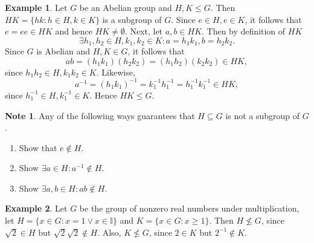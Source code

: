 \documentclass{article}
\newtheorem{theorem}{Theorem}[section]
\theoremstyle{definition}
\newtheorem{example}{Example}[section]
\newtheorem{note}{Note}[section]
\begin{document}
    \begin{example}
    Let $G$ be an Abelian group and $H,K \leq G$. Then $HK = \{hk: h \in H, k \in K\}$ is a subgroup of $G$. Since $e \in H, e \in K$, it follows that $e= ee \in HK$ and hence $HK \neq \emptyset$. Next, let $a,b \in HK$. Then by definition of $HK$
    \begin{equation*}
        \exists h_1,h_2 \in H, k_1,k_2 \in K: a=h_1k_1, b=h_2k_2.
    \end{equation*}
    Since $G$ is Abelian and $H,K \in G$, it follows that
    \begin{equation*}
        ab = (h_1k_1)(h_2k_2) = (h_1h_2)(k_2k_2) \in HK,
    \end{equation*}
    since $h_1h_2 \in H, k_1k_2 \in K$. Likewise,
    \begin{equation*}
        a^{-1} = (h_1k_1)^{-1} = k_1^{-1}h_1^{-1} = h_1^{-1}k_1^{-1} \in HK,
    \end{equation*}
    since $h_1^{-1} \in H, k_1^{-1} \in K$. Hence $HK \leq G$.
    \end{example}
    
    \begin{note}
       Any of the following ways guarantees that $H \subseteq G$ is not a subgroup of $G$.
    \begin{enumerate}
        \item Show that $e \notin H$.
        \item Show $\exists a \in H: a^{-1} \notin H$.
        \item Show $\exists a,b \in H: ab \notin H$.
    \end{enumerate}
    \end{note}
    
    \begin{example}
    Let $G$ be the group of nonzero real numbers under multiplication, let $H = \{x \in G: x=1 \vee x \in \mathbb{I}\}$ and $K= \{x \in G: x \geq 1\}$. Then $H \nleq G$, since $\sqrt{2} \in H$ but $\sqrt{2}\sqrt{2} \notin H$. Also, $K \nleq G$, since $2 \in K$ but $2^{-1} \notin K$.
    \end{example}
    
    \noindent{}
    
\end{document}
